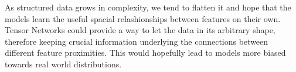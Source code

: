 \documentclass{article}
\theoremstyle{definition}
\theoremstyle{definition}
\begin{document}
As structured data grows in complexity, we tend to flatten it and hope that the models learn the useful spacial relashionships between features on their own. Tensor Networks could provide a way to let the data in its arbitrary shape, therefore keeping crucial information underlying the connections between different feature proximities. This would hopefully lead to models more biased towards real world distributions.



\printbibliography
\end{document}
